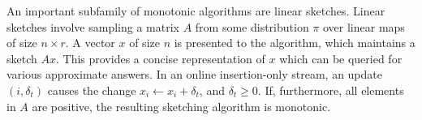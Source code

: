 An important subfamily of monotonic algorithms are linear sketches. Linear sketches involve sampling a
matrix $A$ from some distribution $\pi$ over linear maps of size $n \times r$. A vector $x$ of size $n$ is
presented to the algorithm, which maintains a sketch $Ax$. This provides a concise representation of $x$ which
can be queried for various approximate answers. In an online insertion-only stream, an update $(i, \delta_t)$
causes the change $x_i \gets x_i + \delta_t$, and $\delta_t \geq 0$. If, furthermore, all elements in $A$ are
positive, the resulting sketching algorithm is monotonic.